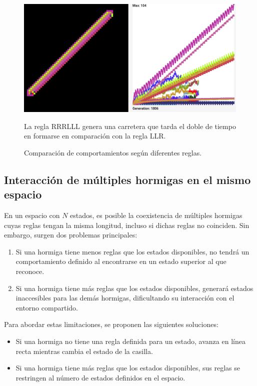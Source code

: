 \documentclass[12pt,twoside]{article}
\begin{document}
\begin{figure}[h!]
	\begin{minipage}{0.45\textwidth}
		\centering
		\includegraphics[width=1.2\textwidth]{img/rrrlll1.png}
	\end{minipage}%
	\vspace{0.3cm}
	
	\begin{minipage}{0.9\textwidth}
		\centering
		\small La regla RRRLLL genera una carretera que tarda el doble de tiempo en formarse en comparación con la regla LLR.
	\end{minipage}
	
	\caption{Comparación de comportamientos según diferentes reglas.}
	\label{fig:rules}
\end{figure}

\clearpage

\subsection{Interacción de múltiples hormigas en el mismo espacio}

En un espacio con $N$ estados, es posible la coexistencia de múltiples hormigas cuyas reglas tengan la misma longitud, incluso si dichas reglas no coinciden. Sin embargo, surgen dos problemas principales:  
\begin{enumerate}
	\item Si una hormiga tiene menos reglas que los estados disponibles, no tendrá un comportamiento definido al encontrarse en un estado superior al que reconoce.  
	\item Si una hormiga tiene más reglas que los estados disponibles, generará estados inaccesibles para las demás hormigas, dificultando su interacción con el entorno compartido.  
\end{enumerate}

Para abordar estas limitaciones, se proponen las siguientes soluciones:  
\begin{itemize}
	\item Si una hormiga no tiene una regla definida para un estado, avanza en línea recta mientras cambia el estado de la casilla.  
	\item Si una hormiga tiene más reglas que los estados disponibles, sus reglas se restringen al número de estados definidos en el espacio.  
\end{itemize}
\end{document}
